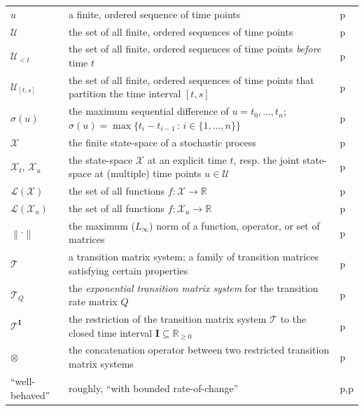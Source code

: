\documentclass[10pt,a4paper]{paper}
\theoremstyle{definition}
\newcommand{\reals}{\mathbb{R}}
\newcommand{\realsnonneg}{\reals_{\geq 0}}
\newcommand{\states}{\mathcal{X}}
\newcommand{\gambles}{\mathcal{L}}
\newcommand{\gamblesX}{\gambles(\states)}
\newcommand{\norm}[1]{\left\lVert #1 \right\rVert}
\newcommand{\placeref}[1]{p\pageref{#1}}
\begin{document}
\begin{table}[htb]
\begin{tabularx}{\textwidth}{l|X|l}
$u$ & a finite, ordered sequence of time points & \placeref{notation:sequenceset} \\
$\mathcal{U}$ & the set of all finite, ordered sequences of time points & \placeref{notation:sequenceset} \\
$\mathcal{U}_{<t}$ & the set of all finite, ordered sequences of time points \emph{before} time $t$ & \placeref{notation:sequenceset_ineq} \\
$\mathcal{U}_{[t,s]}$ & the set of all finite, ordered sequences of time points that partition the time interval $[t,s]$ & \placeref{notation:sequenceset_partition} \\
$\sigma(u)$ & the maximum sequential difference of $u=t_0,\ldots,t_n$; $\sigma(u)=\max\{t_i-{t_{i-1}}\,:\,i\in\{1,\ldots,n\}\}$ & \placeref{notation:sequenceset_partition} \\
$\states$ & the finite state-space of a stochastic process & \placeref{notation:statespace} \\
$\states_t$, $\states_u$ & the state-space $\states$ at an explicit time $t$, resp. the joint state-space at (multiple) time points $u\in\mathcal{U}$ & \placeref{notation:statespace} \\
$\gamblesX$ & the set of all functions $f: \states\to\reals$ & \placeref{notation:functionspace} \\
$\gambles(\states_u)$ & the set of all functions $f:\states_u\to\reals$ & \placeref{notation:functionspacemulti} \\
$\norm{\cdot}$ & the maximum ($L_\infty$) norm of a function, operator, or set of matrices & \placeref{notation:norm} \\
$\mathcal{T}$ & a transition matrix system; a family of transition matrices satisfying certain properties & \placeref{def:trans_mat_system} \\
$\mathcal{T}_Q$ & the \emph{exponential transition matrix system} for the transition rate matrix $Q$ & \placeref{def:systemfromQ} \\
$\mathcal{T}^\mathbf{I}$ & the restriction of the transition matrix system $\mathcal{T}$ to the closed time interval $\mathbf{I}\subseteq\realsnonneg$ & \placeref{notation:restricted_system} \\
$\otimes$ & the concatenation operator between two restricted transition matrix systems & \placeref{def:concatenation_system} \\
``well-behaved'' & roughly, ``with bounded rate-of-change'' & \placeref{def:well_behaved_trans_mat_system},\placeref{def:well-behaved} \\

\end{tabularx}
\end{table}
\end{document}
